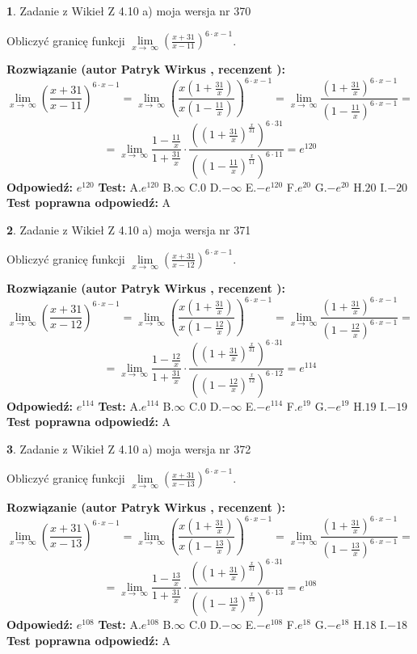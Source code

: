 \documentclass[12pt, a4paper]{article}
\theoremstyle{definition} %
\newtheorem{zad}{}
\newcommand{\zadStart}[1]{\begin{zad}#1\newline}
\newcommand{\zadStop}{\end{zad}}
\newcommand{\rozwStart}[2]{\noindent \textbf{Rozwiązanie (autor #1 , recenzent #2): }\newline}
\newcommand{\rozwStop}{\newline}
\newcommand{\odpStart}{\noindent \textbf{Odpowiedź:}\newline}
\newcommand{\odpStop}{\newline}
\newcommand{\testStart}{\noindent \textbf{Test:}\newline}
\newcommand{\testStop}{\newline}
\newcommand{\kluczStart}{\noindent \textbf{Test poprawna odpowiedź:}\newline}
\newcommand{\kluczStop}{\newline}
\begin{document}
\zadStart{Zadanie z Wikieł Z 4.10 a) moja wersja nr 370}

Obliczyć granicę funkcji  $\lim\limits_{x\to\ \infty}(\frac{x+31}{x-11})^{6\cdot x-1}$.
\zadStop
\rozwStart{Patryk Wirkus}{}
$$\lim\limits_{x\to\ \infty}(\frac{x+31}{x-11})^{6\cdot x-1} = \lim\limits_{x\to\ \infty}(\frac{x(1+\frac{31}{x})}{x(1-\frac{11}{x})})^{6\cdot x-1}=\lim\limits_{x\to\ \infty}\frac{(1+\frac{31}{x})^{6\cdot x-1}}{(1-\frac{11}{x})^{6\cdot x-1}}=$$
$$=\lim\limits_{x\to\ \infty}\frac{1-\frac{11}{x}}{1+\frac{31}{x}}\cdot\frac{((1+\frac{31}{x})^{\frac{x}{31}})^{6\cdot31}}{((1-\frac{11}{x})^{\frac{x}{11}})^{6\cdot11}}=e^{120}$$
\rozwStop
\odpStart
$e^{120}$
\odpStop
\testStart
A.$e^{120}$ B.$\infty$ C.$0$ D.$-\infty$ E.$-e^{120}$
F.$e^{20}$ G.$-e^{20}$
H.$20$
I.$-20$
\testStop
\kluczStart
A
\kluczStop



\zadStart{Zadanie z Wikieł Z 4.10 a) moja wersja nr 371}

Obliczyć granicę funkcji  $\lim\limits_{x\to\ \infty}(\frac{x+31}{x-12})^{6\cdot x-1}$.
\zadStop
\rozwStart{Patryk Wirkus}{}
$$\lim\limits_{x\to\ \infty}(\frac{x+31}{x-12})^{6\cdot x-1} = \lim\limits_{x\to\ \infty}(\frac{x(1+\frac{31}{x})}{x(1-\frac{12}{x})})^{6\cdot x-1}=\lim\limits_{x\to\ \infty}\frac{(1+\frac{31}{x})^{6\cdot x-1}}{(1-\frac{12}{x})^{6\cdot x-1}}=$$
$$=\lim\limits_{x\to\ \infty}\frac{1-\frac{12}{x}}{1+\frac{31}{x}}\cdot\frac{((1+\frac{31}{x})^{\frac{x}{31}})^{6\cdot31}}{((1-\frac{12}{x})^{\frac{x}{12}})^{6\cdot12}}=e^{114}$$
\rozwStop
\odpStart
$e^{114}$
\odpStop
\testStart
A.$e^{114}$ B.$\infty$ C.$0$ D.$-\infty$ E.$-e^{114}$
F.$e^{19}$ G.$-e^{19}$
H.$19$
I.$-19$
\testStop
\kluczStart
A
\kluczStop



\zadStart{Zadanie z Wikieł Z 4.10 a) moja wersja nr 372}

Obliczyć granicę funkcji  $\lim\limits_{x\to\ \infty}(\frac{x+31}{x-13})^{6\cdot x-1}$.
\zadStop
\rozwStart{Patryk Wirkus}{}
$$\lim\limits_{x\to\ \infty}(\frac{x+31}{x-13})^{6\cdot x-1} = \lim\limits_{x\to\ \infty}(\frac{x(1+\frac{31}{x})}{x(1-\frac{13}{x})})^{6\cdot x-1}=\lim\limits_{x\to\ \infty}\frac{(1+\frac{31}{x})^{6\cdot x-1}}{(1-\frac{13}{x})^{6\cdot x-1}}=$$
$$=\lim\limits_{x\to\ \infty}\frac{1-\frac{13}{x}}{1+\frac{31}{x}}\cdot\frac{((1+\frac{31}{x})^{\frac{x}{31}})^{6\cdot31}}{((1-\frac{13}{x})^{\frac{x}{13}})^{6\cdot13}}=e^{108}$$
\rozwStop
\odpStart
$e^{108}$
\odpStop
\testStart
A.$e^{108}$ B.$\infty$ C.$0$ D.$-\infty$ E.$-e^{108}$
F.$e^{18}$ G.$-e^{18}$
H.$18$
I.$-18$
\testStop
\kluczStart
A
\kluczStop
\end{document}

